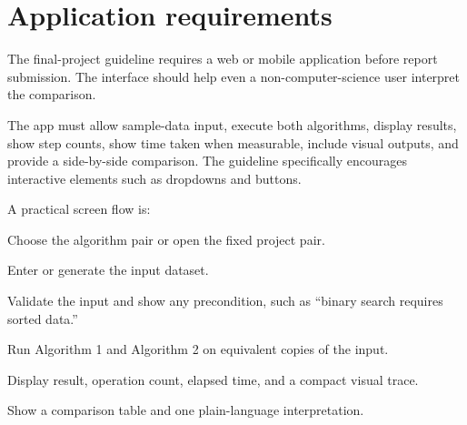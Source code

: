 \section{Application requirements}

The final-project guideline requires a web or mobile application before report submission. The interface should help even a non-computer-science user interpret the comparison.

\begin{projectrequirement}
The app must allow sample-data input, execute both algorithms, display results, show step counts, show time taken when measurable, include visual outputs, and provide a side-by-side comparison. The guideline specifically encourages interactive elements such as dropdowns and buttons.
\end{projectrequirement}

A practical screen flow is:

\begin{mlsteps}
  \item Choose the algorithm pair or open the fixed project pair.
  \item Enter or generate the input dataset.
  \item Validate the input and show any precondition, such as ``binary search requires sorted data.''
  \item Run Algorithm 1 and Algorithm 2 on equivalent copies of the input.
  \item Display result, operation count, elapsed time, and a compact visual trace.
  \item Show a comparison table and one plain-language interpretation.
\end{mlsteps}

